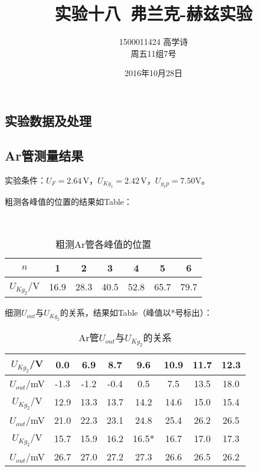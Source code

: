 \documentclass[a4paper,11pt]{article}
\begin{document}
\begin{CJK*}{UTF8}{gbsn}

\title{\textbf{实验十八\ 弗兰克-赫兹实验}}
\author{1500011424  高学诗\\周五11组7号}
\date{2016年10月28日}
\maketitle

\section{实验数据及处理}

\subsection{Ar管测量结果}
实验条件：$U_{F}=2.64\,$V，$U_{Kg_1}=2.42\,$V，$U_{g_{2}p}=7.50$V。\par
粗测各峰值的位置的结果如Table：\\
\begin{table}[htbp]
\caption{粗测Ar管各峰值的位置}
\centering
\\[4pt]
\begin{tabular}{|c|c|c|c|c|c|c|}
\hline
$n$ & 1 & 2 & 3 & 4 & 5 & 6 \\
\hline
$U_{Kg_2}$/V & 16.9 & 28.3 & 40.5 & 52.8 & 65.7 & 79.7\\
\hline
\end{tabular}
\end{table}
\par
细测$U_{out}$与$U_{Kg_2}$的关系，结果如Table（峰值以*号标出）：\\
\begin{longtable}{|c|c|c|c|c|c|c|c|}
\caption{Ar管$U_{out}$与$U_{Kg_2}$的关系}
\centering
\hline
$U_{Kg_2}$/V & 0.0 & 6.9 & 8.7 & 9.6 & 10.9 & 11.7 & 12.3 \\
\hline
$U_{out}$/mV & -1.3 & -1.2 & -0.4 & 0.5 & 7.5 & 13.5 & 18.0 \\
\hline\hline
$U_{Kg_2}$/V & 12.9 & 13.3 & 13.7 & 14.2 & 14.6 & 15.0 & 15.4 \\
\hline
$U_{out}$/mV & 21.0 & 22.3 & 23.1 & 24.8 & 25.4 & 26.2 & 26.5 \\
\hline\hline
$U_{Kg_2}$/V & 15.7 & 15.9 & 16.2 & 16.5* & 16.7 & 17.0 & 17.3 \\
\hline
$U_{out}$/mV & 26.7 & 27.0 & 27.2 & 27.3 & 26.6 & 26.5 & 26.2 \\

\end{longtable}
\end{CJK*}
\end{document}
